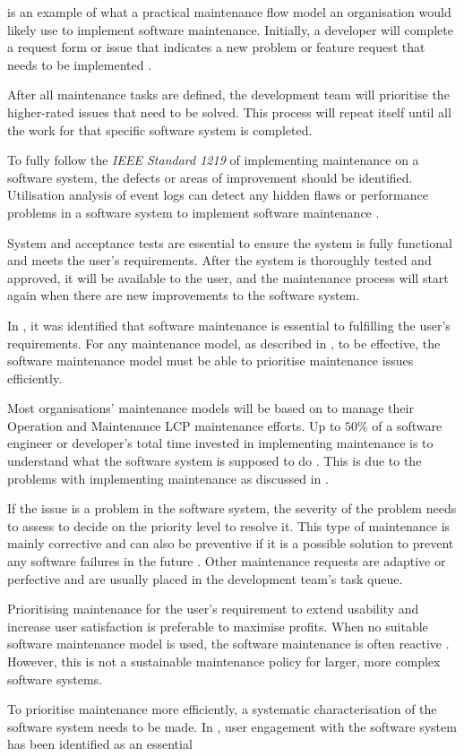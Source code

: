 is an example of what a practical maintenance flow model an organisation would likely use to implement software maintenance. Initially, a developer will complete a request form or issue that indicates a new problem or feature request that needs to be implemented \cite{Tang2010}.\par After all maintenance tasks are defined, the development team will prioritise the higher-rated issues that need to be solved. This process will repeat itself until all the work for that specific software system is completed.\par To fully follow the \textit{IEEE Standard 1219} of implementing maintenance on a software system, the defects or areas of improvement should be identified. Utilisation analysis of event logs can detect any hidden flaws or performance problems in a software system to implement software maintenance \cite{Cinque2013, Rong2018a, Levin2019}.\par System and acceptance tests are essential to ensure the system is fully functional and meets the user's requirements. After the system is thoroughly tested and approved, it will be available to the user, and the maintenance process will start again when there are new improvements to the software system.\par In , it was identified that software maintenance is essential to fulfilling the user's requirements. For any maintenance model, as described in , to be effective, the software maintenance model must be able to prioritise maintenance issues efficiently. \par Most organisations' maintenance models will be based on  to manage their Operation and Maintenance LCP maintenance efforts. Up to $50\%$ of a software engineer or developer's total time invested in implementing maintenance is to understand what the software system is supposed to do \cite{Tang2010}. This is due to the problems with implementing maintenance as discussed in .\par If the issue is a problem in the software system, the severity of the problem needs to assess to decide on the priority level to resolve it. This type of maintenance is mainly corrective and can also be preventive if it is a possible solution to prevent any software failures in the future \cite{Tang2010}. Other maintenance requests are adaptive or perfective and are usually placed in the development team's task queue. \par Prioritising maintenance for the user's requirement to extend usability and increase user satisfaction is preferable to maximise profits. When no suitable software maintenance model is used, the software maintenance is often reactive \cite{Araujo2021}. However, this is not a sustainable maintenance policy for larger, more complex software systems. \par To prioritise maintenance more efficiently, a systematic characterisation of the software system needs to be made. In , user engagement with the software system has been identified as an essential 